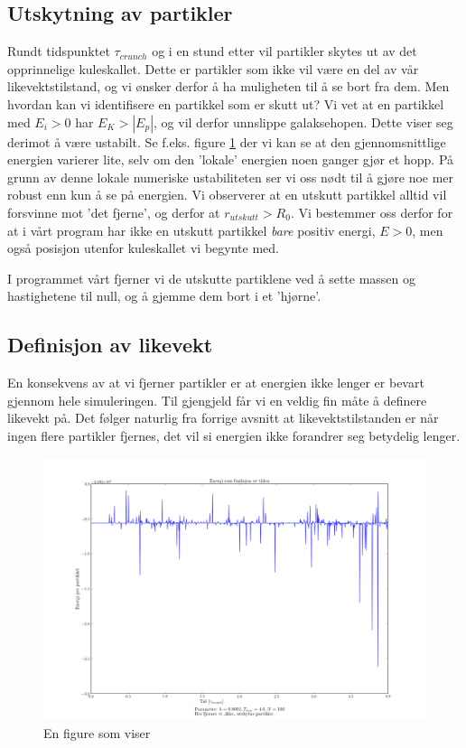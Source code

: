 \documentclass[11pt]{article}
\begin{document}
\begin{multicols}{2}
\subsection{Utskytning av partikler}
Rundt tidspunktet $\tau_{crunch}$ og i en stund etter vil partikler skytes ut
av det opprinnelige kuleskallet. Dette er partikler som ikke vil
være en del av vår likevektstilstand, og vi ønsker derfor å ha muligheten
til å se bort fra dem. Men hvordan kan vi identifisere en partikkel
som er skutt ut? Vi vet at en partikkel med $E_i > 0$ har $E_K > |E_p|$, og
vil derfor unnslippe galaksehopen. Dette viser seg derimot å være ustabilt. Se
f.eks. figure \ref{fig:energivariasjon} der vi kan se at den gjennomsnittlige
energien varierer lite, selv om den 'lokale' energien noen ganger gjør et hopp.
 På grunn av denne lokale numeriske ustabiliteten ser vi oss nødt til å gjøre
noe mer robust enn kun å se på energien. Vi observerer at en utskutt 
partikkel alltid vil forsvinne mot 'det fjerne', og derfor at 
$r_{utskutt} > R_0$. Vi bestemmer oss derfor for at i vårt program har ikke
en utskutt partikkel \emph{bare} positiv energi, $E > 0$, men også posisjon
utenfor kuleskallet vi begynte med. 

I programmet vårt fjerner vi de utskutte
partiklene ved å sette massen og hastighetene til null, og å gjemme dem bort i et 'hjørne'. 


\subsection{Definisjon av likevekt}
En konsekvens av at vi fjerner partikler er at energien ikke lenger er bevart
gjennom hele simuleringen. Til gjengjeld får vi en veldig fin måte å definere
likevekt på. Det følger naturlig fra forrige avsnitt at likevektstilstanden
er når ingen flere partikler fjernes, det vil si energien ikke forandrer seg
betydelig lenger.

\end{multicols}
\begin{figure}[!ht]
  \centering
  \includegraphics[width=\textwidth]{../fig/energivariasjon.png}
  \caption{\label{fig:energivariasjon} En figure som viser  }
\end{figure}
\end{document}
